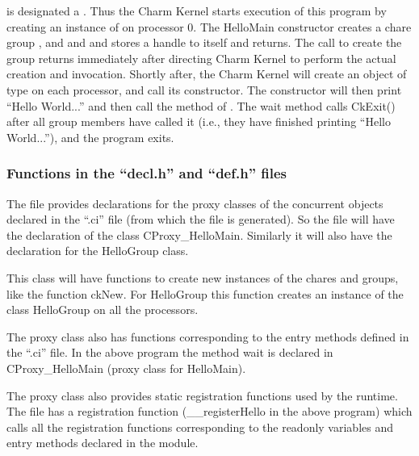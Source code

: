  is designated a . Thus the Charm Kernel starts 
execution of this program by creating an instance of  on 
processor 0. The HelloMain constructor creates a chare group ,
 and and and stores a handle to itself and returns. The call to create the 
group returns immediately after directing Charm Kernel to perform 
the actual creation and invocation. 
Shortly after, the Charm Kernel will create an object of type
 on each processor, and call its constructor. The constructor 
will then print 
``Hello World...'' and then call the  method 
of . The wait method calls CkExit() after all group members have called it (i.e., they have finished printing ``Hello World...''), and the \charmpp program exits.

\subsubsection{Functions in the ``decl.h'' and ``def.h'' files}

	The  file provides declarations for the proxy classes of the concurrent objects declared in the ``.ci'' file (from which the  file is generated). So the  file will have the declaration of the class CProxy\_HelloMain. Similarly it will also have the declaration for the HelloGroup class. 

	This class will have functions to create new instances of the chares and groups, like the function ckNew. For HelloGroup this function creates an instance of the class HelloGroup on all the processors. 

	The proxy class also has functions corresponding to the entry methods defined in the ``.ci'' file. In the above program the method wait is declared in CProxy\_HelloMain (proxy class for HelloMain).

	The proxy class also provides static registration functions used by the \charmpp runtime.  The  file has a registration function (\_\_registerHello in the above program) which calls all the registration functions corresponding to the readonly variables and entry methods declared in the module.


	






